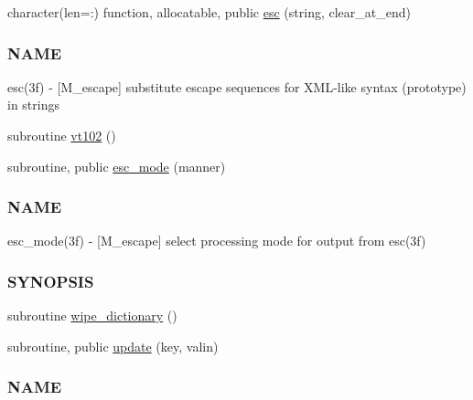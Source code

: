 \begin{DoxyCompactItemize}
\item 
character(len=\+:) function, allocatable, public \mbox{\hyperlink{namespacem__escape_a36f016baad6b23f86189e6f3ee6db0cb}{esc}} (string, clear\+\_\+at\+\_\+end)
\begin{DoxyCompactList}\small\item\em \subsubsection*{N\+A\+ME}

esc(3f) -\/ \mbox{[}M\+\_\+escape\mbox{]} substitute escape sequences for X\+M\+L-\/like syntax (prototype) in strings \end{DoxyCompactList}\item 
subroutine \mbox{\hyperlink{namespacem__escape_ae9d40717b2e75e90e2505d5fed6435c5}{vt102}} ()
\item 
subroutine, public \mbox{\hyperlink{namespacem__escape_a4210456d81d9a1bf328093a9635e640b}{esc\+\_\+mode}} (manner)
\begin{DoxyCompactList}\small\item\em \subsubsection*{N\+A\+ME}

esc\+\_\+mode(3f) -\/ \mbox{[}M\+\_\+escape\mbox{]} select processing mode for output from esc(3f) \subsubsection*{S\+Y\+N\+O\+P\+S\+IS}\end{DoxyCompactList}\item 
subroutine \mbox{\hyperlink{namespacem__escape_a1bc574bc97157fe67d868d2bd180c91e}{wipe\+\_\+dictionary}} ()
\item 
subroutine, public \mbox{\hyperlink{namespacem__escape_a5efd612f60d281003917329484a7960c}{update}} (key, valin)
\begin{DoxyCompactList}\small\item\em \subsubsection*{N\+A\+ME}


\end{DoxyCompactList}
\end{DoxyCompactItemize}
